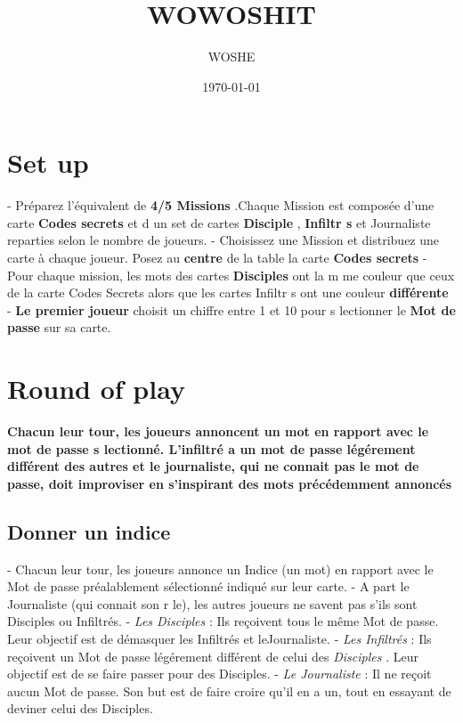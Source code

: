 \documentclass{article}%
\title{WOWOSHIT}%
\author{WOSHE}%
\date{\today}%
\begin{document}
%
\pagestyle{empty}%
\normalsize%
\maketitle%
\section{ Set up
}%
\label{sec:Setup}%
{-} Préparez l'équivalent de %
\textbf{4/5 Missions}%
.Chaque Mission est composée d'une carte %
\textbf{Codes secrets}%
 et d un set de cartes %
\textbf{Disciple}%
,%
\textbf{ Infiltr s}%
 et Journaliste reparties selon le nombre de joueurs.
%
{-} Choisissez une Mission et distribuez une carte à chaque joueur. Posez au %
\textbf{centre}%
 de la table la carte %
\textbf{Codes secrets}%
{-} Pour chaque mission, les mots des cartes %
\textbf{Disciples}%
 ont la m me couleur que ceux de la carte Codes Secrets alors que les cartes Infiltr s ont une couleur%
\textbf{différente}%
{-} %
\textbf{Le premier joueur}%
 choisit un chiffre entre 1 et 10 pour s lectionner le %
\textbf{Mot de passe}%
 sur sa carte.


%
\section{ Round of play
}%
\label{sec:Roundofplay}%
\textbf{Chacun leur tour, les joueurs annoncent un mot en rapport avec le mot de passe s lectionné. L'infiltré a un mot de passe légérement différent des autres et le journaliste, qui ne connait pas le mot de passe, doit improviser en s'inspirant des mots précédemment annoncés}

%
\subsection{ Donner un indice
}%
\label{subsec:Donnerunindice}%
{-} Chacun leur tour, les joueurs annonce un Indice (un mot) en rapport avec le Mot de passe préalablement sélectionné indiqué sur leur carte.
%
{-} A part le Journaliste (qui connait son r le), les autres joueurs ne savent pas s'ils sont Disciples ou Infiltrés.
%
{-} %
\textit{Les Disciples}%
 : Ils reçoivent tous le même Mot de passe. Leur objectif est de démasquer les Infiltrés et leJournaliste.
%
{-} %
\textit{Les Infiltrés}%
 : Ils reçoivent un Mot de passe légérement différent de celui des %
\textit{Disciples}%
. Leur objectif est de se faire passer pour des Disciples.
%
{-} %
\textit{Le Journaliste}%
 : Il ne reçoit aucun Mot de passe. Son but est de faire croire qu'il en a un, tout en essayant de deviner celui des Disciples.
\end{document}
